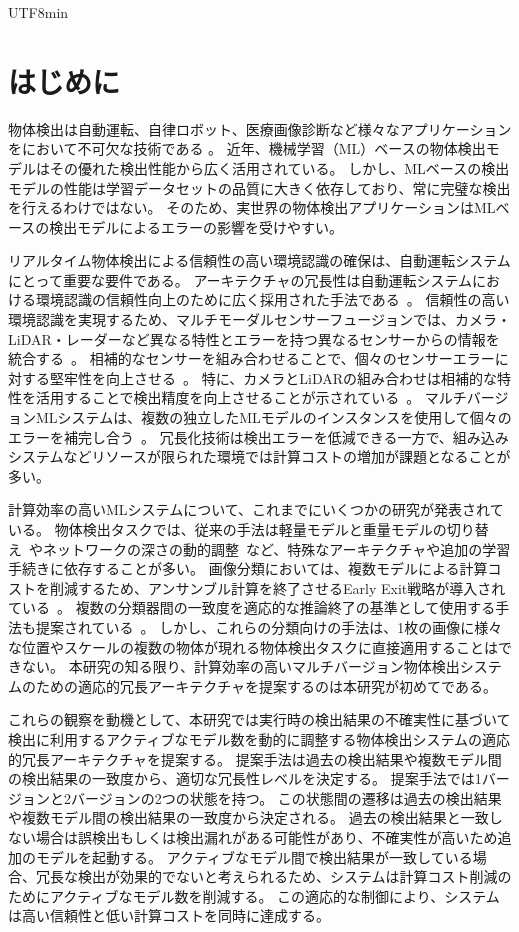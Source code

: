 \documentclass[conference, dvipdfmx]{IEEEtran}
\begin{document}
\begin{CJK}{UTF8}{min}
\section{はじめに}\label{introduction}
物体検出は自動運転、自律ロボット、医療画像診断など様々なアプリケーションをにおいて不可欠な技術である \cite{zou2023}\cite{LITJENS2017}\cite{Grigorescu2020}。
近年、機械学習（ML）ベースの物体検出モデルはその優れた検出性能から広く活用されている。
しかし、MLベースの検出モデルの性能は学習データセットの品質に大きく依存しており、常に完璧な検出を行えるわけではない。
そのため、実世界の物体検出アプリケーションはMLベースの検出モデルによるエラーの影響を受けやすい。

リアルタイム物体検出による信頼性の高い環境認識の確保は、自動運転システムにとって重要な要件である。
アーキテクチャの冗長性は自動運転システムにおける環境認識の信頼性向上のために広く採用された手法である~\cite{SensorFailure2024}。
信頼性の高い環境認識を実現するため、マルチモーダルセンサーフュージョンでは、カメラ・LiDAR・レーダーなど異なる特性とエラーを持つ異なるセンサーからの情報を統合する~\cite{Sensors2021}。
相補的なセンサーを組み合わせることで、個々のセンサーエラーに対する堅牢性を向上させる~\cite{Huang2022}。
特に、カメラとLiDARの組み合わせは相補的な特性を活用することで検出精度を向上させることが示されている~\cite{PointPainting2019}。
マルチバージョンMLシステムは、複数の独立したMLモデルのインスタンスを使用して個々のエラーを補完し合う~\cite{Wen2025, Wen2024}。
冗長化技術は検出エラーを低減できる一方で、組み込みシステムなどリソースが限られた環境では計算コストの増加が課題となることが多い。

計算効率の高いMLシステムについて、これまでにいくつかの研究が発表されている。
物体検出タスクでは、従来の手法は軽量モデルと重量モデルの切り替え~\cite{DynamicDet2023}やネットワークの深さの動的調整~\cite{sabet2021temporalearlyexitsefficient}など、特殊なアーキテクチャや追加の学習手続きに依存することが多い。
画像分類においては、複数モデルによる計算コストを削減するため、アンサンブル計算を終了させるEarly Exit戦略が導入されている~\cite{Inoue2017}。
複数の分類器間の一致度を適応的な推論終了の基準として使用する手法も提案されている~\cite{AgreementCascade2025}。
しかし、これらの分類向けの手法は、1枚の画像に様々な位置やスケールの複数の物体が現れる物体検出タスクに直接適用することはできない。
本研究の知る限り、計算効率の高いマルチバージョン物体検出システムのための適応的冗長アーキテクチャを提案するのは本研究が初めてである。

これらの観察を動機として、本研究では実行時の検出結果の不確実性に基づいて検出に利用するアクティブなモデル数を動的に調整する物体検出システムの適応的冗長アーキテクチャを提案する。
提案手法は過去の検出結果や複数モデル間の検出結果の一致度から、適切な冗長性レベルを決定する。
提案手法では1バージョンと2バージョンの2つの状態を持つ。
この状態間の遷移は過去の検出結果や複数モデル間の検出結果の一致度から決定される。
過去の検出結果と一致しない場合は誤検出もしくは検出漏れがある可能性があり、不確実性が高いため追加のモデルを起動する。
アクティブなモデル間で検出結果が一致している場合、冗長な検出が効果的でないと考えられるため、システムは計算コスト削減のためにアクティブなモデル数を削減する。
この適応的な制御により、システムは高い信頼性と低い計算コストを同時に達成する。


\end{CJK}
\end{document}
